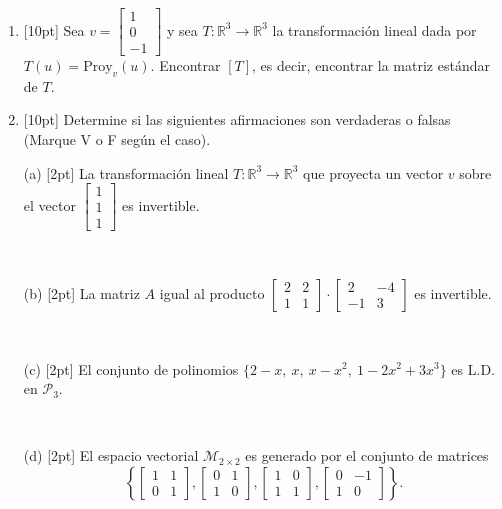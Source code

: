\documentclass[11pt]{article}
\newcommand{\vf}{\fbox{V}\ \fbox{F}}
\begin{document}
\begin{enumerate}
\item{}[10pt] Sea $v = \begin{bmatrix}1\\0\\-1\end{bmatrix}$ y sea $T:\mathbb{R}^3\to\mathbb{R}^3$ la transformación lineal dada por $T(u)=\mathrm{Proy}_v(u)$. Encontrar $[T]$, es decir, encontrar la matriz estándar de $T$.

\vspace{4pt}
\fbox{\begin{minipage}[t][3cm]{\dimexpr\linewidth-2\fboxsep-2\fboxrule}
$[T] = $
\end{minipage}}

\item{}[10pt] Determine si las siguientes afirmaciones son verdaderas o falsas (Marque V o F según el caso).

\vspace{6pt}
\noindent (a) [2pt] La transformación lineal $T:\mathbb{R}^3\to\mathbb{R}^3$ que proyecta un vector $v$ sobre el vector $\begin{bmatrix}1\\1\\1\end{bmatrix}$ es invertible.

\vspace{4pt}
\vf

\vspace{6pt}
\noindent (b) [2pt] La matriz $A$ igual al producto $\begin{bmatrix}2&2\\1&1\end{bmatrix}\cdot\begin{bmatrix}2&-4\\-1&3\end{bmatrix}$ es invertible.

\vspace{4pt}
\vf

\vspace{6pt}
\noindent (c) [2pt] El conjunto de polinomios $\{2-x,\ x,\ x-x^2,\ 1-2x^2+3x^3\}$ es L.D. en $\mathcal{P}_3$.

\vspace{4pt}
\vf

\vspace{6pt}
\noindent (d) [2pt] El espacio vectorial $\mathcal{M}_{2\times 2}$ es generado por el conjunto de matrices
\[
\left\{\begin{bmatrix}1&1\\0&1\end{bmatrix},\begin{bmatrix}0&1\\1&0\end{bmatrix},\begin{bmatrix}1&0\\1&1\end{bmatrix},\begin{bmatrix}0&-1\\1&0\end{bmatrix}\right\}.
\]


\end{enumerate}
\end{document}
